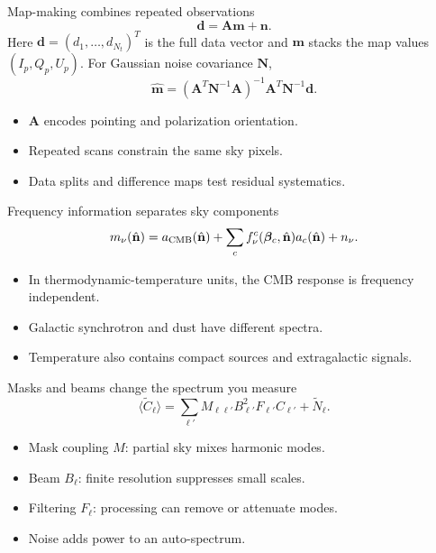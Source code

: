 \begin{frame}{Map-making combines repeated observations}
\[\mathbf d=\mathbf A\mathbf m+\mathbf n.\]
Here $\mathbf d=(d_1,\ldots,d_{N_t})^T$ is the full data vector and $\mathbf m$ stacks the map values $(I_p,Q_p,U_p)$.
For Gaussian noise covariance $\mathbf N$,
\[\widehat{\mathbf m}=(\mathbf A^T\mathbf N^{-1}\mathbf A)^{-1}
\mathbf A^T\mathbf N^{-1}\mathbf d.\]
\begin{itemize}
\item $\mathbf A$ encodes pointing and polarization orientation.
\item Repeated scans constrain the same sky pixels.
\item Data splits and difference maps test residual systematics.
\end{itemize}
\end{frame}

\begin{frame}{Frequency information separates sky components}
\[m_\nu(\hat{\mathbf n})=a_{\rm CMB}(\hat{\mathbf n})+\sum_c f_\nu^c(\bm\beta_c,\hat{\mathbf n})a_c(\hat{\mathbf n})+n_\nu.\]
\begin{itemize}
\item In thermodynamic-temperature units, the CMB response is frequency independent.
\item Galactic synchrotron and dust have different spectra.
\item Temperature also contains compact sources and extragalactic signals.
\end{itemize}
\end{frame}

\begin{frame}{Masks and beams change the spectrum you measure}
\[\langle\widetilde C_\ell\rangle
=\sum_{\ell'}M_{\ell\ell'}B_{\ell'}^2F_{\ell'}C_{\ell'}+\widetilde N_\ell.\]
\begin{itemize}
\item Mask coupling $M$: partial sky mixes harmonic modes.
\item Beam $B_\ell$: finite resolution suppresses small scales.
\item Filtering $F_\ell$: processing can remove or attenuate modes.
\item Noise adds power to an auto-spectrum.
\end{itemize}
\end{frame}


